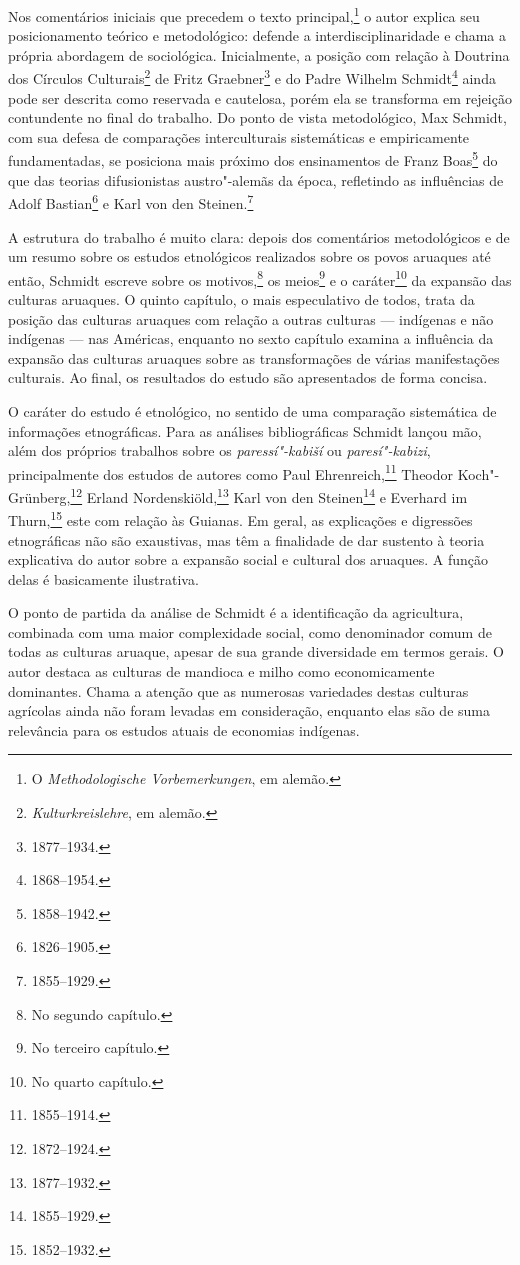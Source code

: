 Nos comentários iniciais que precedem o texto principal,\footnote{O \textit{Methodologische Vorbemerkungen}, em alemão.} o autor explica seu
posicionamento teórico e metodológico: defende a interdisciplinaridade
e chama a própria abordagem de sociológica. Inicialmente, a posição com
relação à Doutrina dos Círculos Culturais\footnote{\textit{Kulturkreislehre}, em alemão.} de Fritz Graebner\footnote{1877--1934.} e do Padre Wilhelm Schmidt\footnote{1868--1954.} ainda pode ser descrita como reservada e cautelosa, porém ela se transforma em
rejeição contundente no final do trabalho. Do ponto de vista
metodológico, Max Schmidt, com sua defesa de comparações interculturais
sistemáticas e empiricamente fundamentadas, se posiciona mais próximo
dos ensinamentos de Franz Boas\footnote{1858--1942.} do que das teorias
difusionistas austro"-alemãs da época, refletindo as influências de
Adolf Bastian\footnote{1826--1905.} e Karl von den Steinen.\footnote{1855--1929.}

A estrutura do trabalho é muito clara: depois dos comentários
metodológicos e de um resumo sobre os estudos etnológicos realizados
sobre os povos aruaques até então, Schmidt escreve sobre os motivos,\footnote{No segundo capítulo.} os meios\footnote{No terceiro capítulo.} e o caráter\footnote{No quarto capítulo.} da expansão das
culturas aruaques. O quinto capítulo, o mais especulativo de todos, trata da
posição das culturas aruaques com relação a outras culturas --- indígenas
e não indígenas --- nas Américas, enquanto no sexto capítulo examina a
influência da expansão das culturas aruaques sobre as transformações de
várias manifestações culturais. Ao final, os resultados do estudo são
apresentados de forma concisa.

O caráter do estudo é etnológico, no sentido de uma comparação
sistemática de informações etnográficas. Para as análises
bibliográficas Schmidt lançou mão, além dos próprios trabalhos sobre os
\textit{paressí"-kabiší} ou \textit{paresí"-kabizi}, principalmente dos estudos de
autores como Paul Ehrenreich,\footnote{1855--1914.} Theodor Koch"-Grünberg,\footnote{1872--1924.} Erland Nordenskiöld,\footnote{1877--1932.} Karl von den Steinen\footnote{1855--1929.} e Everhard im Thurn,\footnote{1852--1932.} este com relação às Guianas. Em geral, as explicações e digressões etnográficas não são
exaustivas, mas têm a finalidade de dar sustento à teoria explicativa do
autor sobre a expansão social e cultural dos aruaques. A função delas é
basicamente ilustrativa.

O ponto de partida da análise de Schmidt é a identificação da
agricultura, combinada com uma maior complexidade social, como
denominador comum de todas as culturas aruaque, apesar de sua grande
diversidade em termos gerais. O autor destaca as culturas de mandioca e
milho como economicamente dominantes. Chama a atenção que as numerosas
variedades destas culturas agrícolas ainda não foram levadas em
consideração, enquanto elas são de suma relevância para os estudos
atuais de economias indígenas.


